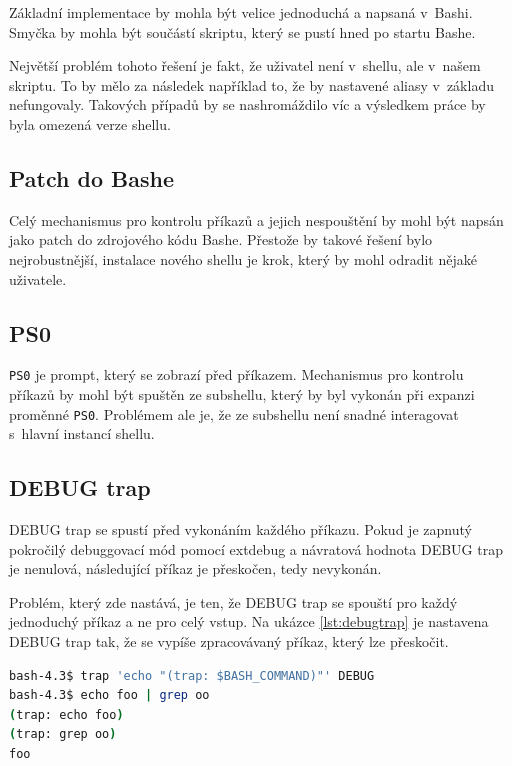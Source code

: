 \documentclass[thesis=M,czech]{FITthesis}[2012/06/26]
\begin{document}
Základní implementace by mohla být velice jednoduchá a napsaná v~Bashi. Smyčka by mohla být součástí skriptu, který se pustí hned po startu Bashe.

Největší problém tohoto řešení je fakt, že uživatel není v~shellu, ale v~našem skriptu. To by mělo za následek například to, že by nastavené aliasy v~základu nefungovaly. Takových případů by se nashromáždilo víc a výsledkem práce by byla omezená verze shellu.


%
%
\subsection{Patch do Bashe}

Celý mechanismus pro kontrolu příkazů a jejich nespouštění by mohl být napsán jako patch do zdrojového kódu Bashe. Přestože by takové řešení bylo nejrobustnější, instalace nového shellu je krok, který by mohl odradit nějaké uživatele.

%
\subsection{PS0}

\texttt{PS0} je prompt, který se zobrazí před  příkazem. Mechanismus pro kontrolu příkazů by mohl být spuštěn ze subshellu, který by byl vykonán při expanzi proměnné \texttt{PS0}. Problémem ale je, že ze subshellu není snadné interagovat s~hlavní instancí shellu.

%
%
\subsection{DEBUG trap}

DEBUG trap se spustí před vykonáním každého příkazu. Pokud je zapnutý pokročilý debuggovací mód pomocí extdebug a návratová hodnota DEBUG trap je nenulová, následující příkaz je přeskočen, tedy nevykonán.

Problém, který zde nastává, je ten, že DEBUG trap se spouští pro každý jednoduchý příkaz a ne pro celý vstup. Na ukázce \ref{lst:debugtrap} je nastavena DEBUG trap tak, že se vypíše zpracovávaný příkaz, který lze přeskočit.

\noindent
\begin{minipage}{\linewidth}
\begin{lstlisting}[language=bash, caption={DEBUG trap}, label={lst:debugtrap}]
bash-4.3$ trap 'echo "(trap: $BASH_COMMAND)"' DEBUG
bash-4.3$ echo foo | grep oo
(trap: echo foo)
(trap: grep oo)
foo
\end{lstlisting}
\end{minipage}
\end{document}
